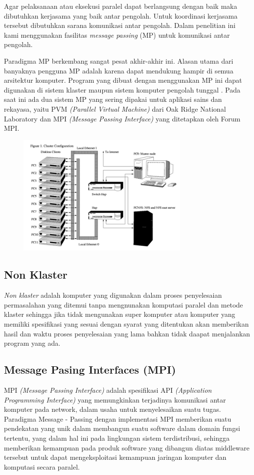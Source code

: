 \documentclass{jtetiproposalskripsi}
\begin{document}
Agar pelaksanaan atau eksekusi paralel dapat berlangsung dengan baik maka dibutuhkan kerjasama yang baik antar pengolah. Untuk koordinasi kerjasama tersebut dibutuhkan sarana komunikasi antar pengolah. Dalam penelitian ini kami menggunakan fasilitas \emph{message passing} (MP) untuk komunikasi antar pengolah.

Paradigma MP berkembang sangat pesat akhir-akhir ini. Alasan utama dari banyaknya pengguna MP adalah karena dapat mendukung hampir di semua arsitektur komputer. Program yang dibuat dengan menggunakan MP ini dapat digunakan di sistem klaster maupun sistem komputer pengolah tunggal . Pada saat ini ada dua sistem MP yang sering dipakai untuk aplikasi sains dan rekayasa, yaitu PVM \emph{(Parallel Virtual Machine)} dari Oak Ridge National Laboratory dan MPI \emph{(Message Passing Interface)} yang ditetapkan oleh Forum MPI.

\begin{figure}
\centering
  \includegraphics[height=6cm]{gambar/mpii}
\end{figure}

\subsection{Non Klaster}
\emph{Non klaster } adalah komputer yang digunakan dalam proses penyelesaian permasalahan yang ditemui tanpa mengnunakan komputasi paralel dan metode klaster sehingga jika tidak mengunakan super komputer atau komputer yang memiliki spesifikasi yang sesuai dengan syarat yang ditentukan akan memberikan hasil dan waktu proses penyelesaian yang lama bahkan tidak daapat menjalankan program yang ada.


\subsection{Message Pasing Interfaces (MPI)}
MPI \emph{(Message Passing Interface)} adalah spesifikasi API \emph{(Application Programming Interface)} yang memungkinkan terjadinya komunikasi antar komputer pada network, dalam usaha untuk menyelesaikan suatu tugas. Paradigma Message - Passing dengan implementasi MPI memberikan suatu pendekatan yang unik dalam membangun suatu software dalam domain fungsi tertentu, yang dalam hal ini pada lingkungan sistem terdistribusi, sehingga memberikan kemampuan pada produk software yang dibangun diatas middleware tersebut untuk dapat mengeksploitasi kemampuan jaringan komputer dan komputasi secara paralel.
\end{document}

